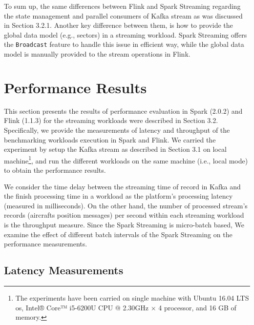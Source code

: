 \documentclass[]{article}
\begin{document}
 
 \par To sum up, the same differences between Flink and Spark Streaming regarding the state management and parallel  consumers of Kafka stream as was discussed in Section 3.2.1. Another key difference between them, is how  to provide the global data model (e.g., sectors) in a streaming workload. Spark Streaming offers the \texttt{Broadcast} feature to handle this issue in efficient way, while the global data model is manually provided  to the stream operations in Flink.
\section{Performance Results}

\par This section presents the results of performance evaluation in Spark (2.0.2) and Flink (1.1.3) for the streaming workloads were described in Section 3.2. Specifically, we provide  the measurements of latency and throughput of the benchmarking workloads execution in Spark and Flink. We carried the experiment by setup the Kafka stream as described in Section 3.1 on local machine\footnote{ The experiments have been carried  on single machine with Ubuntu 16.04 LTS os, Intel® Core™ i5-6200U CPU @ 2.30GHz × 4  processor, and 16 GB of memory.  }, and run the different workloads on the same machine (i.e., local mode) to obtain the performance results.  

\par We consider the time delay between the streaming time of record in Kafka and the 
finish processing time in a workload as the platform's processing latency (measured in milliseconds). On the other hand, the number of processed stream's records (aircrafts position messages) per second within each streaming workload is the throughput measure. Since the Spark Streaming is micro-batch based,  We examine the effect of different batch intervals
of the Spark Streaming on the performance measurements.
\subsection{Latency Measurements}
\end{document}
